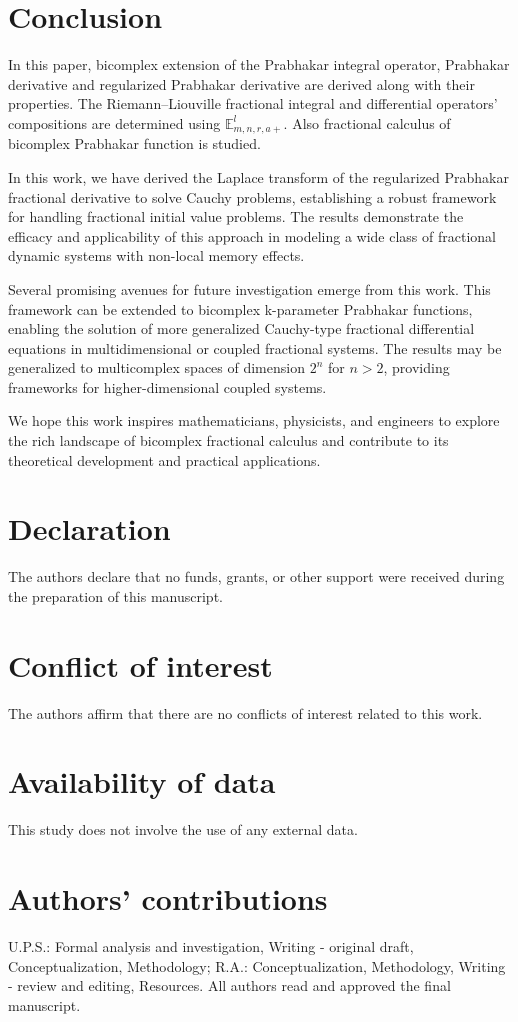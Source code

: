 \documentclass[a4paper,12pt]{article}
\theoremstyle{remark}
\begin{document}
\section{Conclusion}
In this paper, bicomplex extension of the  Prabhakar  integral operator, Prabhakar derivative and regularized Prabhakar derivative are derived along with their properties. The Riemann–Liouville fractional integral and differential operators' compositions are determined using $\mathbb{E}^{l}_{m,n,r,a+}.$   Also fractional calculus of bicomplex Prabhakar function is studied.

In this work, we have derived the Laplace transform of the regularized Prabhakar fractional derivative to solve Cauchy problems, establishing a robust framework for handling fractional initial value problems. 
The results demonstrate the efficacy and applicability of this approach in modeling a wide class of fractional dynamic systems with non-local memory effects.  

Several promising avenues for future investigation emerge from this work. This framework can be extended to bicomplex k-parameter Prabhakar functions, enabling the solution of more generalized Cauchy-type fractional differential equations in multidimensional or coupled fractional systems. The results may be generalized to multicomplex spaces of dimension $2^n$ for $n > 2$, providing frameworks for higher-dimensional coupled systems.

We hope this work inspires mathematicians, physicists, and engineers to explore the rich landscape of bicomplex fractional calculus and contribute to its theoretical development and practical applications.

\section*{Declaration}
The authors declare that no funds, grants, or other support were received during the preparation of this manuscript.


\section*{Conflict of interest}
The authors affirm that there are no conflicts of interest related to this work.

\section*{Availability of data}
This study does not involve the use of any external data.

\section*{Authors’ contributions}
U.P.S.: Formal analysis and investigation, Writing - original draft, Conceptualization, Methodology;
R.A.: Conceptualization, Methodology, Writing - review and editing, Resources. All authors read and approved the final manuscript.


\end{document}
